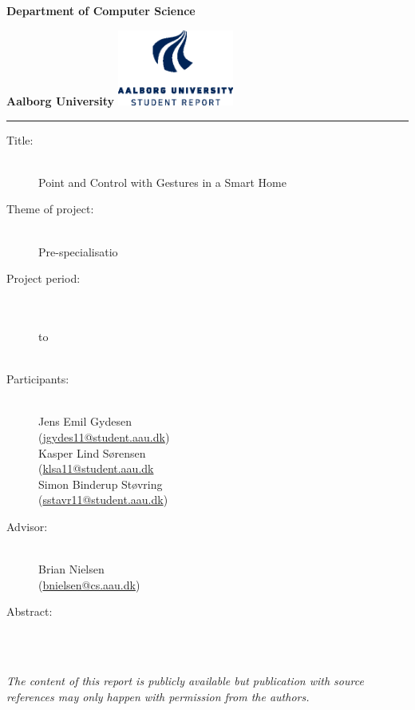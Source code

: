 {\setlength{\parindent}{0pt}
\begin{nopagebreak}
  \begin{minipage}{\textwidth}
    \vspace{2cm}
    \LARGE{\textbf{Department of Computer Science}}\vspace{-2.1cm}

    \large{\textbf{Aalborg University}}
    \hspace{8cm}\includegraphics[height=2.5cm]{images/aau_logo_en_blue.eps}
  \end{minipage}
  \vspace{0.1cm}
  \hrule

  \newcommand{\titleitem}[2]{\item[#1:] ~\\ #2 \\}
  \begin{multicols}{2}
  	\begin{description}
  		\titleitem{Title}{Point and Control with Gestures in a Smart Home}
  		\titleitem{Theme of project}{Pre-specialisatio}
  		\titleitem{Project period}{\protect{}\\ to\\ \protect\formatdate{21}{12}{2015}}
  		\titleitem{Participants}{
  			Jens Emil Gydesen \\ (\url{jgydes11@student.aau.dk})\\ 
  			Kasper Lind Sørensen \\(\url{klsa11@student.aau.dk}\\
  			Simon Binderup Støvring \\(\url{sstavr11@student.aau.dk})
  			}
  		\titleitem{Advisor}{Brian Nielsen\\(\url{bnielsen@cs.aau.dk})}
  	\end{description}
    \vfill
    \columnbreak

    \begin{description}
    	\titleitem{Abstract}{}
    \end{description}

  \end{multicols}
  \vfill

  \begin{center}
    \textit{The content of this report is publicly available but
    publication with source references may only happen with permission from
    the authors.}
  \end{center}
\end{nopagebreak}
}